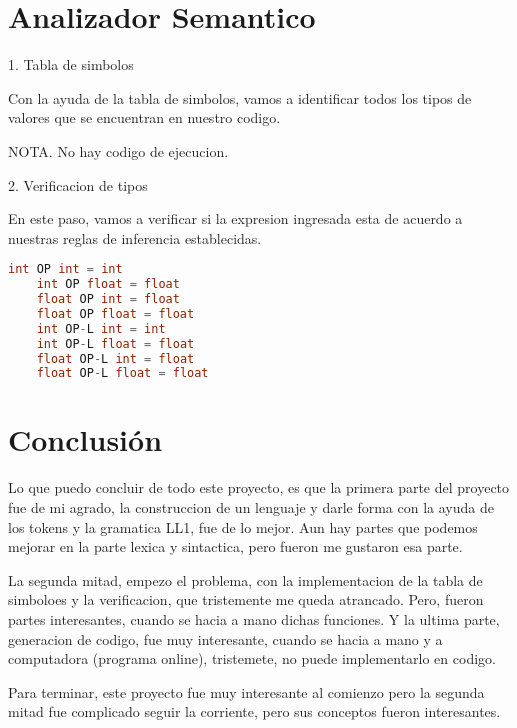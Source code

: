 \documentclass{article}
\begin{document}
\clearpage
\section{Analizador Semantico}
\item 1. Tabla de simbolos
\item Con la ayuda de la tabla de simbolos, vamos a identificar todos los tipos de valores que se encuentran en nuestro codigo.
\item NOTA. No hay codigo de ejecucion.

\item 2. Verificacion de tipos
\item En este paso, vamos a verificar si la expresion ingresada esta de acuerdo a nuestras reglas de inferencia establecidas.
\begin{lstlisting}[language=C++, caption=Reglas de inferencia]
    int OP int = int 
    int OP float = float
    float OP int = float
    float OP float = float
    int OP-L int = int
    int OP-L float = float
    float OP-L int = float
    float OP-L float = float
\end{lstlisting}

\section{Conclusión}
\item Lo que puedo concluir de todo este proyecto, es que la primera parte del proyecto fue de mi agrado, la construccion de un lenguaje y darle forma con la ayuda de los tokens y la gramatica LL1, fue de lo mejor. Aun hay partes que podemos mejorar en la parte lexica y sintactica, pero fueron me gustaron esa parte.
\item La segunda mitad, empezo el problema, con la implementacion de la tabla de simboloes y la verificacion, que tristemente me queda atrancado. Pero, fueron partes interesantes, cuando se hacia a mano dichas funciones. Y la ultima parte, generacion de codigo, fue muy interesante, cuando se hacia a mano y a computadora (programa online), tristemete, no puede implementarlo en codigo.
\item Para terminar, este proyecto fue muy interesante al comienzo pero la segunda mitad fue complicado seguir la corriente, pero sus conceptos fueron interesantes.
\end{document}
